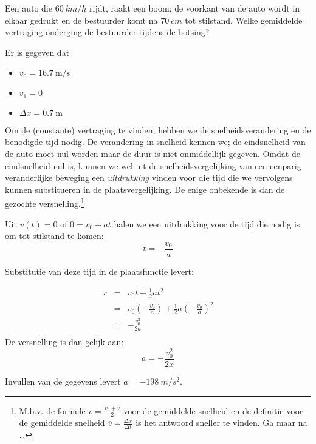 \documentclass{ximera}
\begin{document}
\begin{exercise}

    Een auto die $\SI{60}{km/h}$ rijdt, raakt een boom; de voorkant van de auto wordt in elkaar gedrukt en de bestuurder komt na $\SI{70}{cm}$ tot stilstand. Welke gemiddelde vertraging onderging de bestuurder tijdens de botsing?%
    \begin{oplossing} 
    Er is gegeven dat 
    \begin{itemize}
        \item \( v_0 = \SI{16,7}{\meter\per\second}\)
        \item \(v_1 = 0\)
        \item \(\Delta x = \SI{0.7}{\meter}\)
    \end{itemize}
    Om de (constante) vertraging te vinden, hebben we de snelheidsverandering en de benodigde tijd nodig. 
    De verandering in snelheid kennen we; de eindsnelheid van de auto moet nul worden maar de duur is niet onmiddellijk gegeven. 
    Omdat de eindsnelheid nul is, kunnen we wel uit de snelheidsvergelijking van een eenparig veranderlijke beweging een \textit{uitdrukking} vinden voor die tijd die we vervolgens kunnen substitueren in de plaatsvergelijking. De enige onbekende is dan de gezochte versnelling.\footnote{M.b.v. de formule $\overline{v}=\frac{v_0+v}{2}$ voor de gemiddelde snelheid en de definitie voor de gemiddelde snelheid $\overline{v}=\frac{\Delta x}{\Delta t}$ is het antwoord sneller te vinden. Ga maar na \ldots}

    Uit $v(t)=0$ of $0=v_0+at$ halen we een uitdrukking voor de tijd die nodig is om tot stilstand te komen:
    \[
    t =-\frac{v_0}{a}
    \]

    Substitutie van deze tijd in de plaatsfunctie levert:

    \[
    \begin{array}{rcl}
    x&=&v_0t+\frac{1}{2}at^2\\
    &=&v_0\left(-\frac{v_0}{a}\right)+\frac{1}{2}a\left(-\frac{v_0}{a}\right)^2\\
    &=&-\frac{v_0^2}{2a}\\
    \end{array}
    \]
    De versnelling is dan gelijk aan:
    \[
    a = -\frac{v_0^2}{2x}
    \]

    Invullen van de gegevens levert $a=\SI{-198}{m/s^2}$.%
    \end{oplossing}
    \end{exercise}
    
\end{document}
